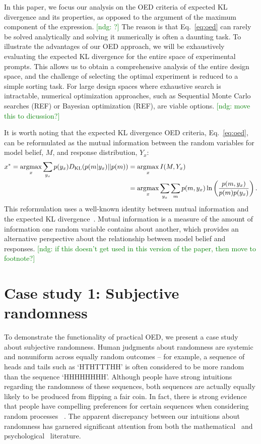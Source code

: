 \documentclass{article}
\newcommand{\ndg}[1]{\textcolor{Green}{[ndg: #1]}}
\newcommand{\argmax}{\operatornamewithlimits{argmax}}
\begin{document}
In this paper, we focus our analysis on the OED criteria of expected KL divergence and its properties, as opposed to the argument of the maximum component of the expression. \ndg{?} The reason is that Eq.~\ref{eq:oed} can rarely be solved analytically and solving it numerically is often a daunting task. To illustrate the advantages of our OED approach, we will be exhaustively evaluating the expected KL divergence for the entire  space of experimental prompts. This allows us to obtain a comprehensive analysis of the entire design space, and the challenge of selecting the optimal experiment is reduced to a simple sorting task. For large design spaces where exhaustive search is intractable, numerical optimization approaches, such as Sequential Monte Carlo searches (REF) or Bayesian optimization (REF), are viable options.  \ndg{move this to dicussion?}

It is worth noting that the expected KL divergence OED criteria, Eq.~\ref{eq:oed}, can be reformulated as the mutual information between the random variables for model belief, $M$, and response distribution, $Y_x$:
\begin{align}
x^* = \argmax_{x} \sum\limits_{y_x} p(y_x) D_{\text{KL}}(p(m|y_x) || p(m)) &= \argmax_{x} I(M, Y_x) \notag \\
    &= \argmax_{x} \sum\limits_{y_x} \sum\limits_{m} p(m, y_x) \ln \left( \frac{p(m, y_x)}{p(m)p(y_x)}\right). \label{eq:mi}
\end{align}
This reformulation uses a well-known identity between mutual information and the expected KL divergence~\cite{cover91:eit}. Mutual information is a measure of the amount of information one random variable contains about another, which provides an alternative perspective about the relationship between model belief and responses.
\ndg{if this doesn't get used in this version of the paper, then move to footnote?}

\section{Case study 1: Subjective randomness}
\label{s:tutorial}

To demonstrate the functionality of practical OED, we present a case study about subjective randomness. Human judgments about randomness are systemic and nonuniform across equally random outcomes -- for example, a sequence of heads and tails such as `HTHTTTHH' is often considered to be more random than the sequence `HHHHHHHH'. Although people have strong intuitions regarding the randomness of these sequences, both sequences are actually equally likely to be produced from flipping a fair coin. In fact, there is strong evidence that people have compelling preferences for certain sequences when considering random processes ~\cite{goodfellow38:jep}. The apparent discrepancy between our intuitions about randomness has garnered significant attention from both the mathematical~\cite{chaitin01:er, kac83:as, li97:kca} and psychological~\cite{falk81:pme, lopes82:jep, griffiths01:cogsci} literature.
\end{document}

